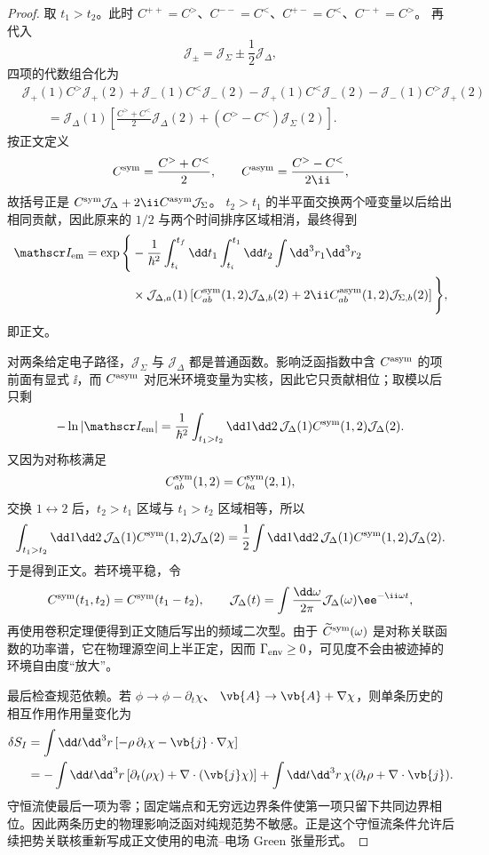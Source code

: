 \begin{proof}
取 $t_1>t_2$。此时
$C^{++}=C^>$、$C^{--}=C^<$、$C^{+-}=C^<$、$C^{-+}=C^>$。
再代入
\[
\mathcal J_\pm
=\mathcal J_\Sigma\pm\frac12\mathcal J_\Delta,
\]
四项的代数组合化为
\begin{align*}
&\mathcal J_+(1)C^>\mathcal J_+(2)
+\mathcal J_-(1)C^<\mathcal J_-(2)
-\mathcal J_+(1)C^<\mathcal J_-(2)
-\mathcal J_-(1)C^>\mathcal J_+(2)\\
&\qquad=
\mathcal J_\Delta(1)
\left[
\frac{C^>+C^<}{2}\mathcal J_\Delta(2)
+(C^>-C^<)\mathcal J_\Sigma(2)
\right].
\end{align*}
按正文定义
\[
C^{\rm sym}=\frac{C^>+C^<}{2},
\qquad
C^{\rm asym}=\frac{C^>-C^<}{2\ii},
\]
故括号正是
$C^{\rm sym}\mathcal J_\Delta+2\ii C^{\rm asym}\mathcal J_\Sigma$。
$t_2>t_1$ 的半平面交换两个哑变量以后给出相同贡献，因此原来的 $1/2$ 与两个时间排序区域相消，最终得到
\[
\begin{aligned}
\mathscr I_{\rm em}
=\exp\Bigg\{&-\frac1{\hbar^2}
\int_{t_i}^{t_f}\dd t_1
\int_{t_i}^{t_1}\dd t_2
\int\dd^3r_1\dd^3r_2\\
&\times\mathcal J_{\Delta,a}(1)
\left[
C_{ab}^{\rm sym}(1,2)\mathcal J_{\Delta,b}(2)
+2\ii C_{ab}^{\rm asym}(1,2)\mathcal J_{\Sigma,b}(2)
\right]\Bigg\},
\end{aligned}
\]
即正文。

对两条给定电子路径，$\mathcal J_\Sigma$ 与 $\mathcal J_\Delta$ 都是普通函数。影响泛函指数中含 $C^{\rm asym}$ 的项前面有显式 $\ii$，而 $C^{\rm asym}$ 对厄米环境变量为实核，因此它只贡献相位；取模以后只剩
\[
-\ln|\mathscr I_{\rm em}|
=\frac1{\hbar^2}
\int_{t_1>t_2}\dd1\dd2\,
\mathcal J_\Delta(1)C^{\rm sym}(1,2)\mathcal J_\Delta(2).
\]
又因为对称核满足
\[
C_{ab}^{\rm sym}(1,2)=C_{ba}^{\rm sym}(2,1),
\]
交换 $1\leftrightarrow2$ 后，$t_2>t_1$ 区域与 $t_1>t_2$ 区域相等，所以
\[
\int_{t_1>t_2}\dd1\dd2\,
\mathcal J_\Delta(1)C^{\rm sym}(1,2)\mathcal J_\Delta(2)
=\frac12\int\dd1\dd2\,
\mathcal J_\Delta(1)C^{\rm sym}(1,2)\mathcal J_\Delta(2).
\]
于是得到正文。若环境平稳，令
\[
C^{\rm sym}(t_1,t_2)=C^{\rm sym}(t_1-t_2),
\qquad
\mathcal J_\Delta(t)=\int\frac{\dd\omega}{2\pi}
\mathcal J_\Delta(\omega)\ee^{-\ii\omega t},
\]
再使用卷积定理便得到正文随后写出的频域二次型。由于 $\widetilde C^{\rm sym}(\omega)$ 是对称关联函数的功率谱，它在物理源空间上半正定，因而 $\Gamma_{\rm env}\ge0$，可见度不会由被迹掉的环境自由度“放大”。

最后检查规范依赖。若
$\phi\to\phi-\partial_t\chi$、
$\vb{A}\to\vb{A}+\nabla\chi$，则单条历史的相互作用作用量变化为
\begin{align*}
\delta S_I
&=\int\dd t\dd^3r\,
[-\rho\,\partial_t\chi-\vb{j}\cdot\nabla\chi]\\
&=-\int\dd t\dd^3r\,
[\partial_t(\rho\chi)+\nabla\cdot(\vb{j}\chi)]
+\int\dd t\dd^3r\,
\chi(\partial_t\rho+\nabla\cdot\vb{j}).
\end{align*}
守恒流使最后一项为零；固定端点和无穷远边界条件使第一项只留下共同边界相位。因此两条历史的物理影响泛函对纯规范势不敏感。正是这个守恒流条件允许后续把势关联核重新写成正文使用的电流--电场 Green 张量形式。
\end{proof}


